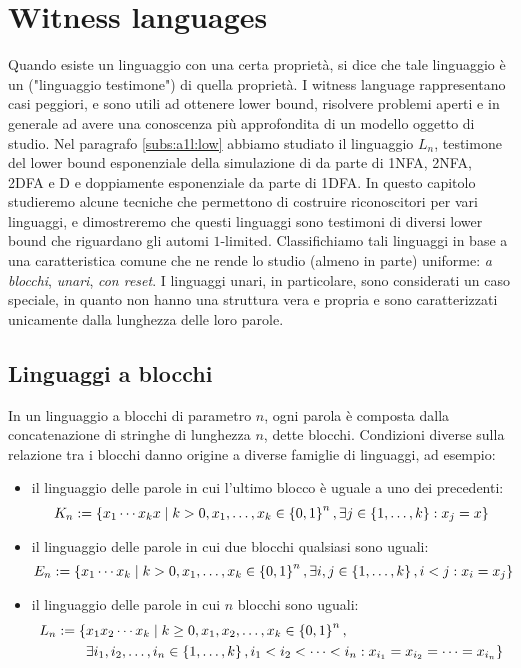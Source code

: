 \chapter{Witness languages}\label{cha:wit}
Quando esiste un linguaggio con una certa proprietà, si dice che tale linguaggio è un  ("linguaggio testimone") di quella proprietà. I witness language rappresentano casi peggiori, e sono utili ad ottenere lower bound, risolvere problemi aperti e in generale ad avere una conoscenza più approfondita di un modello oggetto di studio.
Nel paragrafo \ref{subs:a1l:low} abbiamo studiato il linguaggio $L_n$, testimone del lower bound esponenziale della simulazione di  da parte di 1NFA, 2NFA, 2DFA e D e doppiamente esponenziale da parte di 1DFA.
In questo capitolo studieremo alcune tecniche che permettono di costruire riconoscitori per vari linguaggi, e dimostreremo che questi linguaggi sono testimoni di diversi lower bound che riguardano gli automi $1$-limited.
Classifichiamo tali linguaggi in base a una caratteristica comune che ne rende lo studio (almeno in parte) uniforme: \emph{a blocchi}, \emph{unari}, \emph{con reset}. I linguaggi unari, in particolare, sono considerati un caso speciale, in quanto non hanno una struttura vera e propria e sono caratterizzati unicamente dalla lunghezza delle loro parole.



\section{Linguaggi a blocchi}\label{sec:wit:blk}
In un linguaggio a blocchi di parametro $n$, ogni parola è composta dalla concatenazione di stringhe di lunghezza $n$, dette blocchi. Condizioni diverse sulla relazione tra i blocchi danno origine a diverse famiglie di linguaggi, ad esempio:
\begin{itemize}
	\item il linguaggio delle parole in cui l'ultimo blocco è uguale a uno dei precedenti:
	      \begin{equation*}
		      K_n := \left\{ x_1\cdots x_kx \mid k>0, x_1,\dots,x_k\in\left\{ 0,1 \right\}^n, \exists j\in\left\{ 1,\dots,k \right\}: x_j=x \right\}
	      \end{equation*}
	\item il linguaggio delle parole in cui due blocchi qualsiasi sono uguali:
	      \begin{equation*}
		      E_n := \left\{ x_1\cdots x_k \mid k>0, x_1,\dots,x_k\in\left\{ 0,1 \right\}^n,\exists i,j\in\left\{ 1,\dots,k \right\},i<j: x_i=x_j \right\}
	      \end{equation*}
	\item il linguaggio delle parole in cui $n$ blocchi sono uguali:
	      \begin{align*}
		      L_n := \{ & x_1x_2\cdots x_k\mid k\geq0, x_1,x_2,\dots,x_k\in \left\{ 0,1 \right\}^n,                                  \\
		                & \exists i_1,i_2,\dots,i_n\in\left\{ 1,\dots,k \right\},i_1<i_2<\dots<i_n: x_{i_1}=x_{i_2}=\dots=x_{i_n} \}
	      \end{align*}
\end{itemize}

